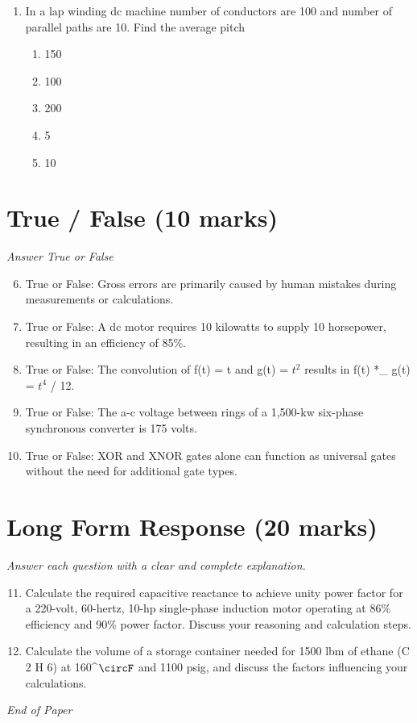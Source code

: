 \documentclass[12pt]{article}
\begin{document}
\begin{enumerate}[label=\arabic*.]
\begin{enumerate}[label=(\alph*)]
    \item (1 - $e^($-2 t)) / t
    \item (2 sinh t) / $t^2$
    \item (2 tanh t) / t
    \item (2 sinh t) / t
    \item (2 tanh t) * t
\end{enumerate}
\item In a lap winding dc machine number of conductors are 100 and number of parallel paths are 10. Find the average pitch
\begin{enumerate}[label=(\alph*)]
    \item 150
    \item 100
    \item 200
    \item 5
    \item 10
\end{enumerate}
\end{enumerate}

\section*{True / False (10 marks)}
\textit{Answer True or False}
\begin{enumerate}[label=\arabic*.]
\setcounter{enumi}{5}
\item True or False: Gross errors are primarily caused by human mistakes during measurements or calculations.
\item True or False: A dc motor requires 10 kilowatts to supply 10 horsepower, resulting in an efficiency of 85\%.
\item True or False: The convolution of f(t) = t and g(t) = $t^2$ results in f(t) *\_ g(t) = $t^4$ / 12.
\item True or False: The a-c voltage between rings of a 1,500-kw six-phase synchronous converter is 175 volts.
\item True or False: XOR and XNOR gates alone can function as universal gates without the need for additional gate types.
\end{enumerate}

\section*{Long Form Response (20 marks)}
\textit{Answer each question with a clear and complete explanation.}
\begin{enumerate}[label=\arabic*.]
\setcounter{enumi}{10}
\item Calculate the required capacitive reactance to achieve unity power factor for a 220-volt, 60-hertz, 10-hp single-phase induction motor operating at 86\% efficiency and 90\% power factor. Discuss your reasoning and calculation steps.
\item Calculate the volume of a storage container needed for 1500 lbm of ethane (C 2 H 6) at 160^\ensuremath{\circF} and 1100 psig, and discuss the factors influencing your calculations.
\end{enumerate}

\vfill
\noindent\textit{End of Paper}
\end{document}
